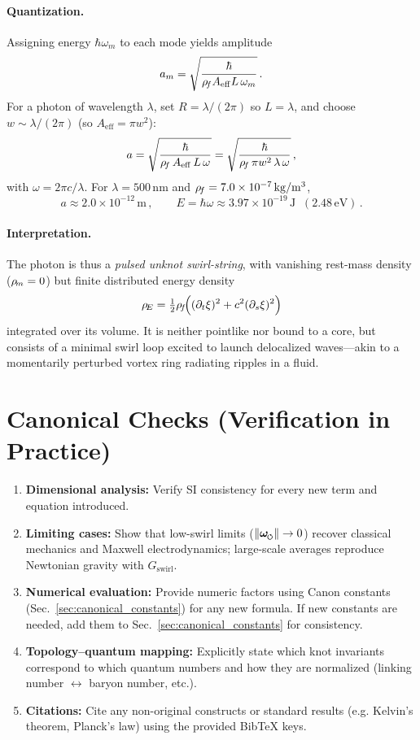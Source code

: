 \documentclass[11pt]{article}
\begin{document}
\paragraph{Quantization.}
    Assigning energy $\hbar \omega_m$ to each mode yields amplitude
    \[
        a_m = \sqrt{\frac{\hbar}{\rho_{\!f} A_{\mathrm{eff}} L \,\omega_m}}\,.
    \]
    For a photon of wavelength $\lambda$, set $R=\lambda/(2\pi)$ so $L=\lambda$, and choose $w\sim\lambda/(2\pi)$ (so $A_{\mathrm{eff}}=\pi w^2$):
    \[
        a = \sqrt{\frac{\hbar}{\rho_{\!f}\,A_{\mathrm{eff}} \,L \,\omega}} = \sqrt{\frac{\hbar}{\rho_{\!f} \,\pi w^2\, \lambda \,\omega}}\,,
    \]
    with $\omega = 2\pi c/\lambda$. For $\lambda = 500\,\mathrm{nm}$ and $\rho_{\!f} = 7.0 \times 10^{-7}\,\mathrm{kg/m^3}$,
    \[
        a \approx 2.0 \times 10^{-12}\,\mathrm{m}\,, \qquad E = \hbar \omega \approx 3.97 \times 10^{-19}\,\mathrm{J}\;\; (2.48\,\mathrm{eV})\,.
    \]

\paragraph{Interpretation.}
    The photon is thus a \emph{pulsed unknot swirl-string}, with vanishing rest-mass density ($\rho_{\!m}=0$) but finite distributed energy density
    \[
        \rho_{\!E} = \tfrac{1}{2}\rho_{\!f}\!\Big((\partial_t \xi)^2 + c^2 (\partial_s \xi)^2\Big)
    \]
    integrated over its volume. It is neither pointlike nor bound to a core, but consists of a minimal swirl loop excited to launch delocalized waves—akin to a momentarily perturbed vortex ring radiating ripples in a fluid.

\section{Canonical Checks (Verification in Practice)}
\label{sec:canonical_checks}
\begin{enumerate}
\item \textbf{Dimensional analysis:} Verify SI consistency for every new term and equation introduced.
\item \textbf{Limiting cases:} Show that low-swirl limits ($\|\omegas\|\to 0$) recover classical mechanics and Maxwell electrodynamics; large-scale averages reproduce Newtonian gravity with $G_{\text{swirl}}$.
\item \textbf{Numerical evaluation:} Provide numeric factors using Canon constants (Sec.~\ref{sec:canonical_constants}) for any new formula. If new constants are needed, add them to Sec.~\ref{sec:canonical_constants} for consistency.
\item \textbf{Topology–quantum mapping:} Explicitly state which knot invariants correspond to which quantum numbers and how they are normalized (linking number $\leftrightarrow$ baryon number, etc.).
\item \textbf{Citations:} Cite any non-original constructs or standard results (e.g. Kelvin’s theorem, Planck’s law) using the provided BibTeX keys.
\end{enumerate}
\end{document}
